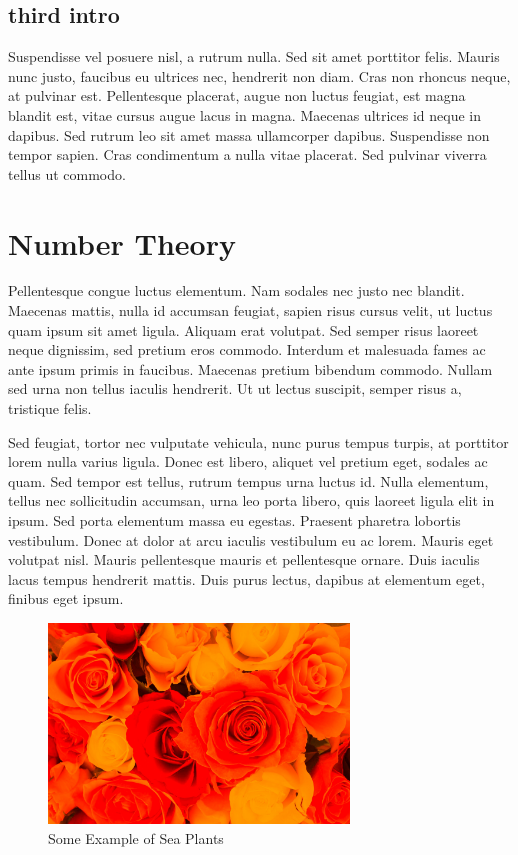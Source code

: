 \documentclass[a4paper, 12pt]{article}
\begin{document}
	\subsection{third intro}
	\begin{flushleft}
		Suspendisse vel posuere nisl, a rutrum nulla. Sed sit amet porttitor felis. Mauris nunc justo, faucibus eu ultrices nec, hendrerit non diam. Cras non rhoncus neque, at pulvinar est. Pellentesque placerat, augue non luctus feugiat, est magna blandit est, vitae cursus augue lacus in magna. Maecenas ultrices id neque in dapibus. Sed rutrum leo sit amet massa ullamcorper dapibus. Suspendisse non tempor sapien. Cras condimentum a nulla vitae placerat. Sed pulvinar viverra tellus ut commodo.
	\end{flushleft}
	
	\section*{Number Theory}
	Pellentesque congue luctus elementum. Nam sodales nec justo nec blandit. Maecenas mattis, nulla id accumsan feugiat, sapien risus cursus velit, ut luctus quam ipsum sit amet ligula. Aliquam erat volutpat. Sed semper risus laoreet neque dignissim, sed pretium eros commodo. Interdum et malesuada fames ac ante ipsum primis in faucibus. Maecenas pretium bibendum commodo. Nullam sed urna non tellus iaculis hendrerit. Ut ut lectus suscipit, semper risus a, tristique felis.
	
	Sed feugiat, tortor nec vulputate vehicula, nunc purus tempus turpis, at porttitor lorem nulla varius ligula. Donec est libero, aliquet vel pretium eget, sodales ac quam. Sed tempor est tellus, rutrum tempus urna luctus id. Nulla elementum, tellus nec sollicitudin accumsan, urna leo porta libero, quis laoreet ligula elit in ipsum. Sed porta elementum massa eu egestas. Praesent pharetra lobortis vestibulum. Donec at dolor at arcu iaculis vestibulum eu ac lorem. Mauris eget volutpat nisl. Mauris pellentesque mauris et pellentesque ornare. Duis iaculis lacus tempus hendrerit mattis. Duis purus lectus, dapibus at elementum eget, finibus eget ipsum.	
	\begin{figure}[h!]
		\centering
		\includegraphics[width=8cm]{images/f1.jpg}
		\caption{Some Example of Sea Plants}
		\label{fig:f1}
	\end{figure}
	
\end{document}
